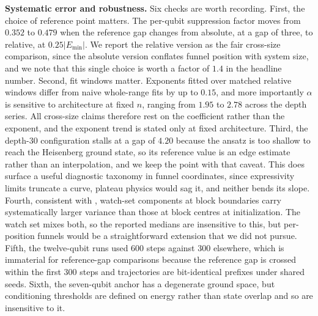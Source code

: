 \documentclass[conference]{IEEEtran}%
\begin{document}
\textbf{Systematic error and robustness.} Six checks are worth recording. First, the choice of reference point matters. The per-qubit suppression factor moves from $0.352$ to $0.479$ when the reference gap changes from absolute, at a gap of three, to relative, at $0.25\lvert E_{\min}\rvert$. We report the relative version as the fair cross-size comparison, since the absolute version conflates funnel position with system size, and we note that this single choice is worth a factor of $1.4$ in the headline number. Second, fit windows matter. Exponents fitted over matched relative windows differ from naive whole-range fits by up to $0.15$, and more importantly $\alpha$ is sensitive to architecture at fixed $n$, ranging from $1.95$ to $2.78$ across the depth series. All cross-size claims therefore rest on the coefficient rather than the exponent, and the exponent trend is stated only at fixed architecture. Third, the depth-30 configuration stalls at a gap of $4.20$ because the ansatz is too shallow to reach the Heisenberg ground state, so its reference value is an edge estimate rather than an interpolation, and we keep the point with that caveat. This does surface a useful diagnostic taxonomy in funnel coordinates, since expressivity limits truncate a curve, plateau physics would sag it, and neither bends its slope. Fourth, consistent with \cite{grant}, watch-set components at block boundaries carry systematically larger variance than those at block centres at initialization. The watch set mixes both, so the reported medians are insensitive to this, but per-position funnels would be a straightforward extension that we did not pursue. Fifth, the twelve-qubit runs used 600 steps against 300 elsewhere, which is immaterial for reference-gap comparisons because the reference gap is crossed within the first 300 steps and trajectories are bit-identical prefixes under shared seeds. Sixth, the seven-qubit anchor has a degenerate ground space, but conditioning thresholds are defined on energy rather than state overlap and so are insensitive to it.
\end{document}
